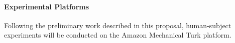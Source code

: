 
\paragraph{Experimental Platforms}



Following the preliminary work described in this proposal, human-subject experiments will be conducted on the Amazon Mechanical Turk platform.

